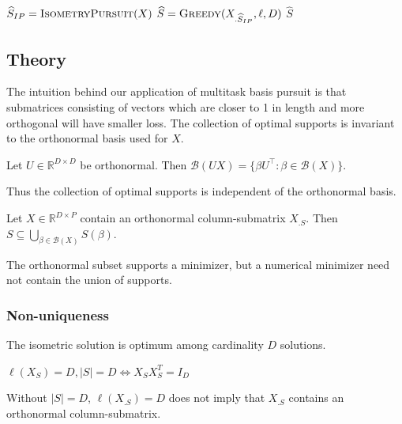 \begin{algorithm}[H]
\caption{\tsip(Matrix ${X} \in \mathbb{R}^{D \times P}$)}
\begin{algorithmic}[1]
\STATE $\widehat{S}_{IP} = \text{{\sc IsometryPursuit}}(X)$
\STATE $\widehat{S} = \text{\textsc{Greedy}}({X}_{.\widehat{S}_{IP}}, \ell, D)$ 
 $\widehat{S}$
\end{algorithmic}
\end{algorithm}

\subsection{Theory}

The intuition behind our application of multitask basis pursuit is that submatrices consisting of vectors which are closer to 1 in length and more orthogonal will have smaller loss.
The collection of optimal supports is invariant to the orthonormal basis used for $X$.
\begin{proposition}
\label{prop:basis_pursuit_selection_invariance}
Let $U \in \mathbb R^{D \times D}$ be orthonormal.
Then $\mathcal B(UX)=\{\beta U^\top:\beta\in\mathcal B(X)\}$.
\end{proposition}
Thus the collection of optimal supports is independent of the orthonormal basis.

\begin{proposition}
\label{prop:unitary_selection}
Let $X\in\mathbb R^{D\times P}$ contain an orthonormal column-submatrix $X_{.S}$.
Then $S\subseteq\bigcup_{\beta\in\mathcal B(X)}S(\beta)$.
\end{proposition}

The orthonormal subset supports a minimizer, but a numerical minimizer need not contain the union of supports.

\subsubsection{Non-uniqueness}

The isometric solution is optimum among cardinality $D$ solutions.
\begin{proposition}
\label{prop:D_min}
$\ell (X_S) = D , |S| = D \Leftrightarrow X_S X_S^T = I_D$
\end{proposition}
\par{}
\begin{proposition}
\label{prop:loss_without_isometry}
Without $|S|=D$, $\ell(X_{.S})=D$ does not imply that $X_{.S}$ contains an orthonormal column-submatrix.
\end{proposition}

